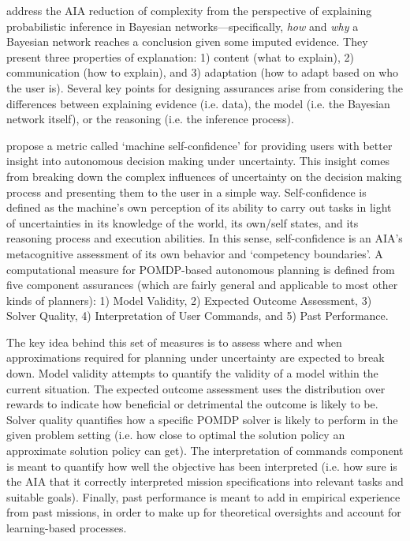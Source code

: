 \citet{Lacave2002-cu} address the AIA reduction of complexity from the perspective of explaining probabilistic inference in Bayesian networks---specifically, \emph{how} and \emph{why} a Bayesian network reaches a conclusion given some imputed evidence. 
They present three properties of explanation: 1) content (what to explain), 2) communication (how to explain), and 3) adaptation (how to adapt based on who the user is). Several key points for designing assurances arise from considering the differences between explaining evidence (i.e. data), the model (i.e. the Bayesian network itself), or the reasoning (i.e. the inference process).

\citet{Aitken2016-cv} propose a metric called `machine self-confidence' for providing users with better insight into autonomous decision making under uncertainty. This insight comes from breaking down the complex influences of uncertainty on the decision making process and presenting them to the user in a simple way. Self-confidence is defined as the machine's own perception of its ability to carry out tasks in light of uncertainties in its knowledge of the world, its own/self states, and its reasoning process and execution abilities. In this sense, self-confidence is an AIA's metacognitive assessment of its own behavior and `competency boundaries'. A computational measure for POMDP-based autonomous planning is defined from five component assurances (which are fairly general and applicable to most other kinds of planners): 1) Model Validity, 2) Expected Outcome Assessment, 3) Solver Quality, 4) Interpretation of User Commands, and 5) Past Performance. 

The key idea behind this set of measures is to assess where and when approximations required for planning under uncertainty are expected to break down. Model validity attempts to quantify the validity of a model within the current situation. The expected outcome assessment uses the distribution over rewards to indicate how beneficial or detrimental the outcome is likely to be. Solver quality quantifies how a specific POMDP solver is likely to perform in the given problem setting (i.e. how close to optimal the solution policy an approximate solution policy can get). The interpretation of commands component is meant to quantify how well the objective has been interpreted (i.e. how sure is the AIA that it correctly interpreted mission specifications into relevant tasks and suitable goals). Finally, past performance is meant to add in empirical experience from past missions, in order to make up for theoretical oversights and account for learning-based processes.

